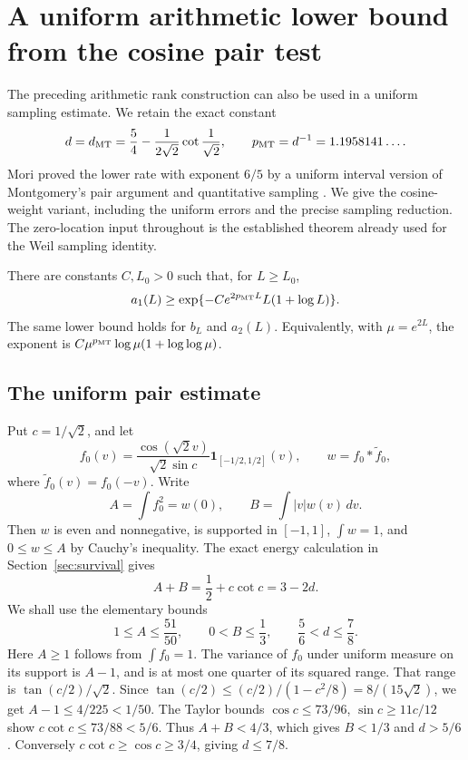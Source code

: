 \section{A uniform arithmetic lower bound from the cosine pair test}
\label{sec:cosine-lower-rate}

The preceding arithmetic rank construction can also be used in a
uniform sampling estimate. We retain the exact constant
\[
 d=d_{\rm MT}=\frac54-\frac1{2\sqrt2}\cot\frac1{\sqrt2},
 \qquad p_{\rm MT}=d^{-1}=1.1958141\ldots.
\]
Mori proved the lower rate with exponent \(6/5\) by a uniform
interval version of Montgomery's pair argument and quantitative
sampling \cite[Theorem~4.3, pp.~11--13]{mori-rh-alone2026}.
We give the cosine-weight variant, including the uniform errors and
the precise sampling reduction. The zero-location input throughout
is the established theorem already used for the Weil sampling identity.

\begin{theorem}
\label{thm:cosine-lower-rate}
There are constants \(C,L_0>0\) such that, for \(L\ge L_0\),
\[
 a_1(L)\ge
 \exp\{-C e^{2p_{\rm MT}L}L(1+\log L)\}.
\]
The same lower bound holds for \(b_L\) and \(a_2(L)\).
Equivalently, with \(\mu=e^{2L}\), the exponent is
\(C\mu^{p_{\rm MT}}\log\mu(1+\log\log\mu)\).
\end{theorem}

\subsection{The uniform pair estimate}

Put \(c=1/\sqrt2\), and let
\[
 f_0(v)=\frac{\cos(\sqrt2v)}{\sqrt2\sin c}
              \mathbf1_{[-1/2,1/2]}(v),\qquad
 w=f_0*\widetilde f_0,
\]
where \(\widetilde f_0(v)=f_0(-v)\). Write
\[
 A=\int f_0^2=w(0),\qquad
 B=\int |v|w(v)\,dv.
\]
Then \(w\) is even and nonnegative, is supported in \([-1,1]\),
\(\int w=1\), and \(0\le w\le A\) by Cauchy's inequality.
The exact energy calculation in Section~\ref{sec:survival} gives
\begin{equation}\label{eq:cosine-energy}
 A+B=\frac12+c\cot c=3-2d.
\end{equation}
We shall use the elementary bounds
\begin{equation}\label{eq:cosine-coarse}
 1\le A\le\frac{51}{50},\qquad
 0<B\le\frac13,\qquad
 \frac56<d\le\frac78.
\end{equation}
Here \(A\ge1\) follows from \(\int f_0=1\). The variance of
\(f_0\) under uniform measure on its support is \(A-1\), and is
at most one quarter of its squared range. That range is
\(\tan(c/2)/\sqrt2\). Since
\(\tan(c/2)\le (c/2)/(1-c^2/8)=8/(15\sqrt2)\),
we get \(A-1\le4/225<1/50\).
The Taylor bounds
\(\cos c\le73/96\), \(\sin c\ge11c/12\) show
\(c\cot c\le73/88<5/6\). Thus \(A+B<4/3\),
which gives \(B<1/3\) and \(d>5/6\).
Conversely \(c\cot c\ge\cos c\ge3/4\), giving \(d\le7/8\).

